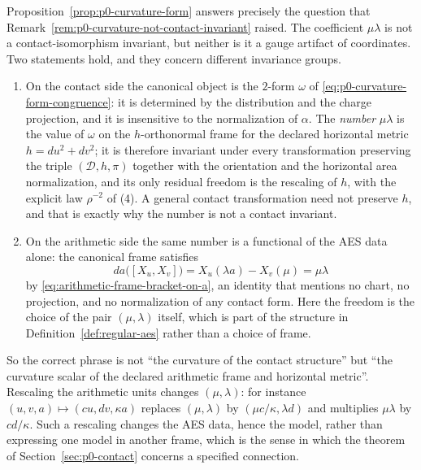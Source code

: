 \begin{remark}
\label{rem:p0-curvature-invariance}
Proposition~\ref{prop:p0-curvature-form} answers precisely the question that
Remark~\ref{rem:p0-curvature-not-contact-invariant} raised.  The coefficient
$\mu\lambda$ is not a contact-isomorphism invariant, but neither is it a gauge
artifact of coordinates.  Two statements hold, and they concern different
invariance groups.

\begin{enumerate}
  \item On the contact side the canonical object is the $2$-form $\omega$ of
  \eqref{eq:p0-curvature-form-congruence}: it is determined by the distribution
  and the charge projection, and it is insensitive to the normalization of
  $\alpha$.  The \emph{number} $\mu\lambda$ is the value of $\omega$ on the
  $h$-orthonormal frame for the declared horizontal metric $h=du^2+dv^2$; it is
  therefore invariant under every transformation preserving the triple
  $(\mathcal D,h,\pi)$ together with the orientation and the horizontal area
  normalization, and its only residual freedom is the rescaling of $h$, with the
  explicit law $\rho^{-2}$ of (4).  A general contact transformation need not
  preserve $h$, and that is exactly why the number is not a contact invariant.
  \item On the arithmetic side the same number is a functional of the AES data
  alone: the canonical frame satisfies
  \[
    da\bigl([X_u,X_v]\bigr)=X_u(\lambda a)-X_v(\mu)=\mu\lambda
  \]
  by \eqref{eq:arithmetic-frame-bracket-on-a}, an identity that mentions no
  chart, no projection, and no normalization of any contact form.  Here the
  freedom is the choice of the pair $(\mu,\lambda)$ itself, which is part of the
  structure in Definition~\ref{def:regular-aes} rather than a choice of frame.
\end{enumerate}

So the correct phrase is not ``the curvature of the contact structure'' but
``the curvature scalar of the declared arithmetic frame and horizontal metric''.
Rescaling the arithmetic units changes $(\mu,\lambda)$: for instance
$(u,v,a)\mapsto(cu,dv,\kappa a)$ replaces $(\mu,\lambda)$ by
$(\mu c/\kappa,\lambda d)$ and multiplies $\mu\lambda$ by $cd/\kappa$.  Such a
rescaling changes the AES data, hence the model, rather than expressing one model
in another frame, which is the sense in which the theorem of
Section~\ref{sec:p0-contact} concerns a specified connection.
\end{remark}

